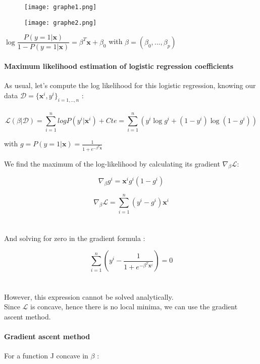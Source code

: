 \documentclass[a4paper,12pt]{article}
\newcommand{\dd}{\mathcal{D}}
\newcommand{\xx}{{\bm x}}
\begin{document}
\begin{figure}[H]
\centering
\begin{minipage}[b!]{0.4\textwidth}
\texttt{[image: graphe1.png]}
\end{minipage}
\hfill
\begin{minipage}[b!]{0.4\textwidth}
\texttt{[image: graphe2.png]}
\end{minipage}
\end{figure}
\begin{center}
\(\log \dfrac{P(y=1|\xx)}{1 - P(y=1|\xx)} = \beta^T\xx + \beta_0\) with \(\beta = (\beta_0, ..., \beta_p)\)\\
\end{center}

\paragraph{Maximum likelihood estimation of logistic regression coefficients}

As usual, let's compute the log likelihood for this logistic regression, knowing our data \(\dd = {\{\xx^i,\textit{y}^i\}}_{\textit{i}=1,..,\textit{n}}\)  :\\
\\
\[\mathcal{L}(\beta|\dd) = \displaystyle\sum_{i=1}^{n} log P(y^i|\xx^i) + Cte = \displaystyle\sum_{i=1}^{n} (y^i \log g^i + (1-y^i) \log(1-g^i))\]
\begin{center}
with \(g = P(y=1|\xx) = \frac{1}{1+e^{-\beta^T\xx}}\)
\end{center}
We find the maximum of the log-likelihood by calculating its gradient \(\nabla_{\beta}\mathcal{L}\):

\[\nabla_{\beta}g^i = \xx^i g^i (1-g^i)\]

\[\nabla_{\beta}\mathcal{L} = \displaystyle\sum_{i=1}^{n} (y^i-g^i)\xx^i\]\\
\\
And solving for zero in the gradient formula :

\[\displaystyle\sum_{i=1}^{n} \left( y^i - \frac{1}{1 + e^{-\beta^T\xx^i}} \right) = 0\]\\
\\
However, this expression cannot be solved analytically. \\ Since $\mathcal{L}$ is concave, hence there is no local minima, we can use the gradient ascent method.
\\
\paragraph{Gradient ascent method} For a function J concave in $\beta$ :
\end{document}

